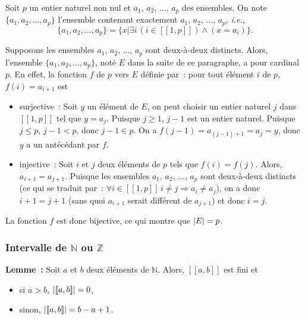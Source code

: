 Soit $p$ un entier naturel non nul et $a_1$, $a_2$, ..., $a_p$ des ensembles. 
On note $\lbrace a_1, a_2, \dots, a_p \rbrace$ l'ensemble contenant exactement $a_1$, $a_2$, ..., $a_p$, \textit{i.e.}, 
\begin{equation*}
    \lbrace a_1, a_2, \dots, a_p \rbrace = \lbrace x \vert \exists i \, (i \in [\![1,p]\!]) \wedge (x = a_i) \rbrace.
\end{equation*}

Supposons les ensembles $a_1$, $a_2$, ..., $a_p$ sont deux-à-deux distincts. 
Alors, l'ensemble $\lbrace a_1, a_2, \dots, a_p \rbrace$, noté $E$ dans la suite de ce paragraphe, a pour cardinal $p$. 
En effet, la fonction $f$ de $p$ vers $E$ définie par : pour tout élément $i$ de $p$, $f(i) = a_{i+1}$ est
\begin{itemize}[nosep]
    \item surjective : Soit $y$ un élément de $E$, on peut choisir un entier naturel $j$ dans $[\![1,p]\!]$ tel que $y = a_j$.
        Puisque $j \geq 1$, $j-1$ est un entier naturel.
        Puisque $j \leq p$, $j-1 < p$, donc $j-1 \in p$. 
        On a $f(j-1) = a_{(j-1)+1} = a_j = y$, donc $y$ a un antécédant par $f$.
    \item injective : Soit $i$ et $j$ deux éléments de $p$ tels que $f(i) = f(j)$.
        Alors, $a_{i+1} = a_{j+1}$.
        Puisque les ensembles $a_1$, $a_2$, ..., $a_p$ sont deux-à-deux distincts (ce qui se traduit par : $\forall i \in [\![1,p]\!] \, i \neq j \Rightarrow a_i \neq a_j$), on a donc $i+1 = j+1$ (sans quoi $a_{i+1}$ serait différent de $a_{j+1}$) et donc $i = j$.
\end{itemize}
La fonction $f$ est donc bijective, ce qui montre que $\left\lvert E \right\rvert = p$.

\subsubsection{Intervalle de \texorpdfstring{$\mathbb{N}$}{N} ou \texorpdfstring{$\mathbb{Z}$}{Z}}

\noindent\textbf{Lemme :} Soit $a$ et $b$ deux éléments de $\mathbb{N}$. 
    Alors, $[\![a, b]\!]$ est fini et
    \begin{itemize}[nosep]
        \item si $a > b$, $\left\lvert [\![a, b]\!] \right\rvert = 0$, 
        \item sinon, $\left\lvert [\![a,b]\!] \right\rvert = b - a + 1$.
    \end{itemize}

\medskip

